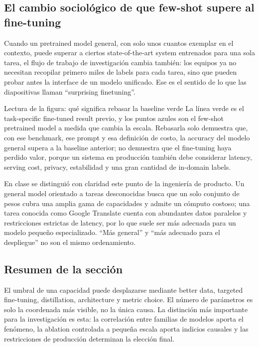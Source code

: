 
\subsection{El cambio sociológico de que few-shot supere al fine-tuning}

Cuando un pretrained model general, con solo unos cuantos exemplar en el contexto, puede superar a ciertos state-of-the-art system entrenados para una sola tarea, el flujo de trabajo de investigación cambia también: los equipos ya no necesitan recopilar primero miles de labels para cada tarea, sino que pueden probar antes la interface de un modelo unificado. Ese es el sentido de lo que las diapositivas llaman ``surprising finetuning''.


\begin{knowledgebox}{Lectura de la figura: qué significa rebasar la baseline verde}
La línea verde es el task-specific fine-tuned result previo, y los puntos azules son el few-shot pretrained model a medida que cambia la escala. Rebasarla solo demuestra que, con ese benchmark, ese prompt y esa definición de costo, la accuracy del modelo general supera a la baseline anterior; no demuestra que el fine-tuning haya perdido valor, porque un sistema en producción también debe considerar latency, serving cost, privacy, estabilidad y una gran cantidad de in-domain labels.
\end{knowledgebox}

En clase se distinguió con claridad este punto de la ingeniería de producto. Un general model orientado a tareas desconocidas busca que un solo conjunto de pesos cubra una amplia gama de capacidades y admite un cómputo costoso; una tarea conocida como Google Translate cuenta con abundantes datos paralelos y restricciones estrictas de latency, por lo que suele ser más adecuada para un modelo pequeño especializado. ``Más general'' y ``más adecuado para el despliegue'' no son el mismo ordenamiento.

\subsection{Resumen de la sección}

El umbral de una capacidad puede desplazarse mediante better data, targeted fine-tuning, distillation, architecture y metric choice. El número de parámetros es solo la coordenada más visible, no la única causa. La distinción más importante para la investigación es esta: la correlación entre familias de modelos aporta el fenómeno, la ablation controlada a pequeña escala aporta indicios causales y las restricciones de producción determinan la elección final.

